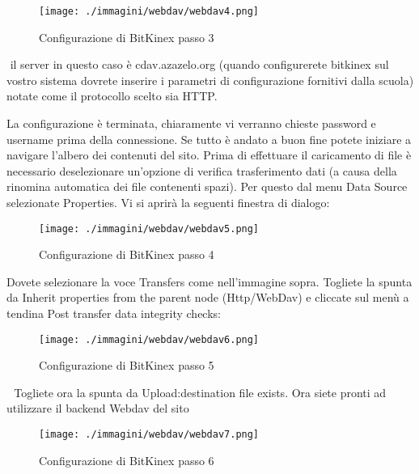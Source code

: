 \begin{figure}[H]
 \centering
 \texttt{[image: ./immagini/webdav/webdav4.png]}
 \caption{Configurazione di BitKinex passo 3}
 \label{fig:bitkinex4}
\end{figure}



 il server in questo caso è cdav.azazelo.org (quando configurerete bitkinex sul vostro sistema dovrete inserire i parametri di configurazione fornitivi dalla scuola) notate come il protocollo scelto sia HTTP.

La configurazione è terminata, chiaramente vi verranno chieste password e username
prima della connessione.
Se tutto è andato a buon fine potete iniziare a navigare l'albero dei contenuti del sito.
Prima di effettuare il caricamento di file è necessario deselezionare un'opzione di verifica
trasferimento dati (a causa della rinomina automatica dei file contenenti spazi). Per questo
dal menu Data Source selezionate Properties.
Vi si aprirà la seguenti finestra di dialogo:

\begin{figure}[H]
 \centering
 \texttt{[image: ./immagini/webdav/webdav5.png]}
 \caption{Configurazione di BitKinex passo 4}
 \label{fig:bitkinex5}
\end{figure}



Dovete selezionare la voce Transfers come nell'immagine sopra. Togliete la spunta da
Inherit properties from the parent node (Http/WebDav) e cliccate sul menù a tendina Post
transfer data integrity checks:

\begin{figure}[H]
 \centering
 \texttt{[image: ./immagini/webdav/webdav6.png]}
 \caption{Configurazione di BitKinex passo 5}
 \label{fig:bitkinex}
\end{figure}



  Togliete ora la spunta da Upload:destination file exists. Ora siete pronti ad utilizzare il
backend Webdav del sito

\begin{figure}[H]
 \centering
 \texttt{[image: ./immagini/webdav/webdav7.png]}
 \caption{Configurazione di BitKinex passo 6}
 \label{fig:bitkinex6}
\end{figure}


